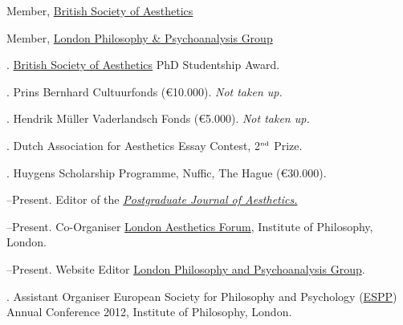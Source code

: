 \documentclass[11pt]{article}
\begin{document}
\bigskip

% 
% 
% 
% 
{}

\ind Member, \href{http://www.philosophy-psychoanalysis.org.uk}{British Society of Aesthetics}

\ind Member, \href{http://www.philosophy-psychoanalysis.org.uk}{London Philosophy \& Psychoanalysis Group}

\bigskip

\medskip

. \href{http://www.british-aesthetics.org}{British Society of Aesthetics} PhD Studentship Award. %

. Prins Bernhard Cultuurfonds (€10.000). \emph{Not taken up.}

. Hendrik Müller Vaderlandsch Fonds (€5.000). \emph{Not taken up.} 

. Dutch Association for Aesthetics Essay Contest, 2$^{\textrm{\tiny{nd}}}$ Prize.

. Huygens Scholarship Programme, Nuffic, The Hague (€30.000).

\bigskip 

\medskip

--Present. Editor of the \href{http:\\www.pjaesthetics.org}{\emph{Postgraduate Journal of Aesthetics.}}

--Present. Co-Organiser \href{http:\\www.londonaestheticsforum.org}{London Aesthetics Forum}, Institute of Philosophy, London.

--Present. Website Editor \href{http://www.philosophy-psychoanalysis.org.uk}{London Philosophy and Psychoanalysis Group}.

. Assistant Organiser European Society for Philosophy and Psychology (\href{http://www.eurospp.org}{ESPP}) Annual Conference 2012, Institute of Philosophy, London. 
\end{document}
